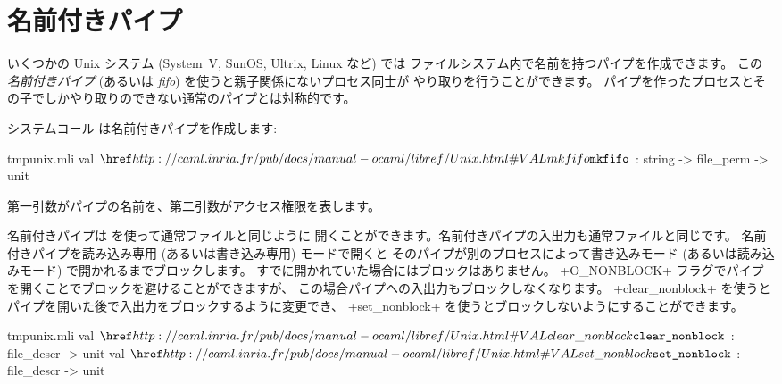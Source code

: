 \section{名前付きパイプ}

いくつかの Unix システム (System~V, SunOS, Ultrix, Linux など) では
ファイルシステム内で名前を持つパイプを作成できます。
この \emph{名前付きパイプ} (あるいは \emph{fifo}) を使うと親子関係にないプロセス同士が
やり取りを行うことができます。
パイプを作ったプロセスとその子でしかやり取りのできない通常のパイプとは対称的です。

システムコール  は名前付きパイプを作成します:
%
\begin{listingcodefile}{tmpunix.mli}
val $\libvalue{Unix}{mkfifo}$ : string -> file_perm -> unit
\end{listingcodefile}
%
第一引数がパイプの名前を、第二引数がアクセス権限を表します。

名前付きパイプは  を使って通常ファイルと同じように
開くことができます。名前付きパイプの入出力も通常ファイルと同じです。
名前付きパイプを読み込み専用 (あるいは書き込み専用) モードで開くと
そのパイプが別のプロセスによって書き込みモード (あるいは読み込みモード) で開かれるまでブロックします。
すでに開かれていた場合にはブロックはありません。
\ml+O_NONBLOCK+ フラグでパイプを開くことでブロックを避けることができますが、
この場合パイプへの入出力もブロックしなくなります。
\ml+clear_nonblock+ を使うとパイプを開いた後で入出力をブロックするように変更でき、
\ml+set_nonblock+ を使うとブロックしないようにすることができます。
%
\begin{listingcodefile}{tmpunix.mli}
val $\indexlibvalue{Unix}{clear\_nonblock}$ : file_descr -> unit
val $\indexlibvalue{Unix}{set\_nonblock}$ : file_descr -> unit
\end{listingcodefile}

